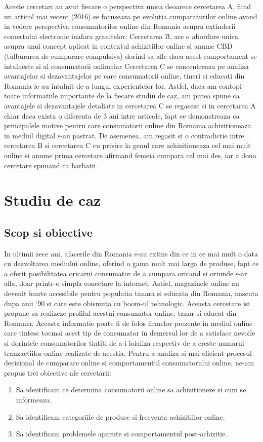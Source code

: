 \documentclass[a4paper, 12pt]{article}
\begin{document}
		\quad Aceste cercetari au avut fiecare o perspectiva unica deoarece cercetarea A, fiind un articol mai recent (2016) se focuseaza pe evolutia cumparaturilor online avand in vedere perspectiva consumatorilor online din Romania asupra extinderii comertului electronic inafara granitelor; Cercetarea B, are o abordare unica asupra unui concept aplicat in contextul achizitiilor online si anume CBD (tulburarea de cumparare compulsiva) dorind sa afle daca acest comportament se intalneste si al consumatorii online;iar Cercetarea C se concentreaza pe analiza avantajelor si dezavantajelor pe care consumatorii online, tineri si educati din Romania le-au intalnit de-a lungul experientelor lor. Astfel, daca am contopi toate informatiile importante de la fiecare studiu de caz, am putea spune ca avantajele si dezavantajele detaliate in cercetarea C se regasesc si in cercetarea A chiar daca exista o diferenta de 3 ani intre articole, fapt ce demonstreaza ca principalele motive pentru care consumatorii online din Romania achizitioneaza in mediul digital s-au pastrat. De asemenea, am regasit si o contradictie intre cercetarea B si cercetarea C cu privire la genul care achizitioneaza cel mai mult online si anume prima cercetare afirmand femeia cumpara cel mai des, iar a doua cercetare spunand ca barbatii.
	
	
	
	
\section{Studiu de caz }
	\subsection{Scop si obiective}
	
	\qquad In ultimii zece ani, afacerile din Romania s-au extins din ce in ce mai mult o data cu dezvoltarea mediului online, oferind o gama mult mai larga de produse, fapt ce a oferit posibilitatea oricarui consumator de a cumpara oricand si oriunde s-ar afla, doar printr-o simpla conectare la internet. Astfel, magazinele online au devenit foarte accesibile pentru populatia tanara si educata din Romania, nascuta dupa anii `90 si care este obisnuita cu boom-ul tehnologic. Aceasta cercetare isi propune sa realizeze profilul  acestui consumator online, tanar si educat din Romania.  Aceasta informatie poate fi de folos  firmelor prezente in mediul online care tintesc tocmai acest tip de consumator in demersul lor de a satisface nevoile si dorintele consumatorilor tintiti de a-i loializa respectiv de a creste numarul tranzactiilor online realizate de acestia. Pentru a analiza si mai eficient procesul decizional de cumparare online si comportamentul consumatorului online, ne-am propus trei obiective ale cercetarii: 
	\begin{enumerate}[(1)]
		\item Sa identificam ce determina consumatorii online sa achizitioneze si cum se informeaza.
		\item Sa identificam categoriile de produse si frecventa achizitiilor online.
		\item Sa identificam problemele aparute si comportamentul post-achizitie.
	\end{enumerate}
\end{document}
